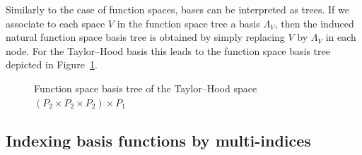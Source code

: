 \documentclass[a4paper,10pt,headings=normal,bibliography=totoc]{scrartcl}
\begin{document}
Similarly to the case of function spaces, bases can be interpreted as trees.
If we associate to each space $V$ in the function space tree a basis $\Lambda_V$,
then the induced natural function space basis tree is obtained by simply replacing
$V$ by $\Lambda_V$ in each node. For the Taylor--Hood basis this leads to the
function space basis tree depicted in Figure~\ref{fig:taylor_hood_basis_tree}.

\begin{figure}
    \begin{center}
    \end{center}
    \caption{Function space basis tree of the Taylor--Hood space $(P_2 \times P_2 \times P_2)\times P_1$}
    \label{fig:taylor_hood_basis_tree}
\end{figure}



\subsection{Indexing basis functions by multi-indices}
\label{sec:index_trees}
\end{document}

